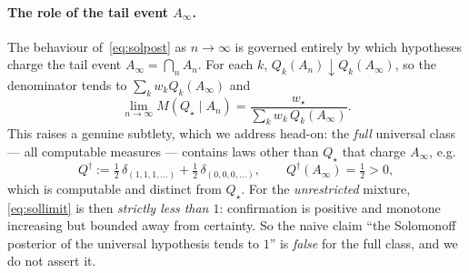 \documentclass{amsart}
\theoremstyle{definition}
\begin{document}
\paragraph{The role of the tail event $A_\infty$.}
The behaviour of~\eqref{eq:solpost} as $n\to\infty$ is governed entirely by which
hypotheses charge the tail event $A_\infty=\bigcap_n A_n$. For each $k$,
$Q_k(A_n)\downarrow Q_k(A_\infty)$, so the denominator tends to
$\sum_k w_k Q_k(A_\infty)$ and
\begin{equation}\label{eq:sollimit}
  \lim_{n\to\infty}M(Q_\star\mid A_n)=\frac{w_\star}{\sum_k w_k\,Q_k(A_\infty)} .
\end{equation}
This raises a genuine subtlety, which we address head-on: the \emph{full}
universal class --- all computable measures --- contains laws other than
$Q_\star$ that charge $A_\infty$, e.g.\
\[
  Q^{\dagger}:=\tfrac12\,\delta_{(1,1,1,\dots)}+\tfrac12\,\delta_{(0,0,0,\dots)},
  \qquad Q^{\dagger}(A_\infty)=\tfrac12>0,
\]
which is computable and distinct from $Q_\star$. For the \emph{unrestricted}
mixture, \eqref{eq:sollimit} is then \emph{strictly less than $1$}: confirmation
is positive and monotone increasing but bounded away from certainty. So the naive
claim ``the Solomonoff posterior of the universal hypothesis tends to $1$'' is
\emph{false} for the full class, and we do not assert it.
\end{document}
